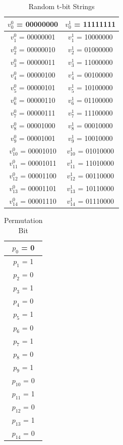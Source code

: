 \documentclass[times]{article}
\begin{document}
	\begin{table}
		\centering
		\caption{Random t-bit Strings}
		\label{tab:random_string}
		\begin{tabular}{| c | c |}
			\hline
			$v_0^0$ = 00000000 & $v_0^1$ = 11111111 \\
			\hline
			$v_1^0$ = 00000001 & $v_1^1$ = 10000000 \\
			\hline
			$v_2^0$ = 00000010 & $v_2^1$ = 01000000 \\
			\hline
			$v_3^0$ = 00000011 & $v_3^1$ = 11000000 \\
			\hline
			$v_4^0$ = 00000100 & $v_4^1$ = 00100000 \\
			\hline
			$v_5^0$ = 00000101 & $v_5^1$ = 10100000 \\
			\hline
			$v_6^0$ = 00000110 & $v_6^1$ = 01100000 \\
			\hline
			$v_7^0$ = 00000111 & $v_7^1$ = 11100000 \\
			\hline
			$v_8^0$ = 00001000 & $v_8^1$ = 00010000 \\
			\hline
			$v_9^0$ = 00001001 & $v_9^1$ = 10010000 \\
			\hline
			$v_{10}^0$ = 00001010 & $v_{10}^1$ = 01010000 \\
			\hline
			$v_{11}^0$ = 00001011 & $v_{11}^1$ = 11010000 \\
			\hline
			$v_{12}^0$ = 00001100 & $v_{12}^1$ = 00110000 \\
			\hline
			$v_{13}^0$ = 00001101 & $v_{13}^1$ = 10110000 \\
			\hline
			$v_{14}^0$ = 00001110 & $v_{14}^1$ = 01110000 \\
			\hline
		\end{tabular}
	\end{table}

	\begin{table}
		\centering
		\caption{Permutation Bit}
		\label{tab:permutation}
		\begin{tabular}{| c |}
			\hline
			$p_{0}$ = 0 \\
			\hline
			$p_{1}$ = 1 \\
			\hline
			$p_{2}$ = 0 \\
			\hline
			$p_{3}$ = 1 \\
			\hline
			$p_{4}$ = 0 \\
			\hline
			$p_{5}$ = 1 \\
			\hline
			$p_{6}$ = 0 \\
			\hline
			$p_{7}$ = 1 \\
			\hline
			$p_{8}$ = 0 \\
			\hline
			$p_{9}$ = 1 \\
			\hline
			$p_{10}$ = 0 \\
			\hline
			$p_{11}$ = 1 \\
			\hline
			$p_{12}$ = 0 \\
			\hline
			$p_{13}$ = 1 \\
			\hline
			$p_{14}$ = 0 \\
			\hline
		\end{tabular}
	\end{table}
\end{document}
